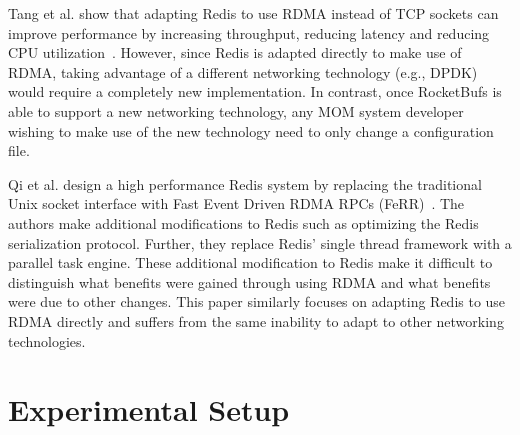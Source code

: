 \documentclass[letterpaper,twocolumn,10pt]{article}
\begin{document}
Tang et al. show that adapting Redis to use RDMA instead of TCP sockets can improve performance by increasing throughput, reducing latency and reducing CPU utilization~\cite{RDMAOverTCP}. 
However, since Redis is adapted directly to make use of RDMA, taking advantage of a different networking technology (e.g., DPDK) would require a completely new implementation. In contrast, once RocketBufs is able to support a new networking technology, any MOM system developer wishing to make use of the new technology need to only change a configuration file.

Qi et al. design a high performance Redis system by replacing the traditional Unix socket interface with Fast Event Driven RDMA RPCs (FeRR)~\cite{RediswithRPCs5}.
The authors make additional modifications to Redis such as optimizing the Redis serialization protocol. Further, they replace Redis' single thread framework with a parallel task engine. These additional modification to Redis make it difficult to distinguish what benefits were gained through using RDMA and what benefits were due to other changes. This paper similarly focuses on adapting Redis to use RDMA directly and suffers from the same inability to adapt to other networking technologies.


\section{Experimental Setup}
\end{document}
